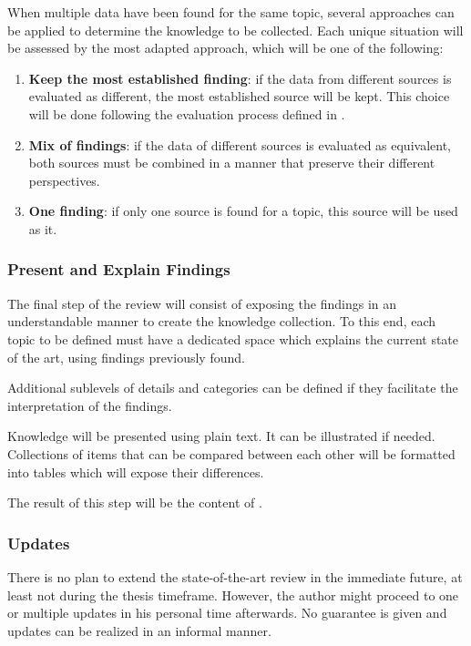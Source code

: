 When multiple data have been found for the same topic, several approaches can be applied to determine the knowledge to be collected. Each unique situation will be assessed by the most adapted approach, which will be one of the following:
\begin{enumerate}
    \item \textbf{Keep the most established finding}: if the data from different sources is evaluated as different, the most established source will be kept. This choice will be done following the evaluation process defined in .
    \item \textbf{Mix of findings}: if the data of different sources is evaluated as equivalent, both sources must be combined in a manner that preserve their different perspectives.
    \item \textbf{One finding}: if only one source is found for a topic, this source will be used as it.
\end{enumerate}

\subsubsection{Present and Explain Findings}
\label{subsubsec:state_methodology_approach_communication}

The final step of the review will consist of exposing the findings in an understandable manner to create the knowledge collection. To this end, each topic to be defined must have a dedicated space which explains the current state of the art, using findings previously found.

Additional sublevels of details and categories can be defined if they facilitate the interpretation of the findings.

Knowledge will be presented using plain text. It can be illustrated if needed. Collections of items that can be compared between each other will be formatted into tables which will expose their differences. 

The result of this step will be the content of .

\subsubsection{Updates}
\label{subsubsec:state_methodology_approach_updates}

There is no plan to extend the state-of-the-art review in the immediate future, at least not during the thesis timeframe. However, the author might proceed to one or multiple updates in his personal time afterwards. No guarantee is given and updates can be realized in an informal manner.

